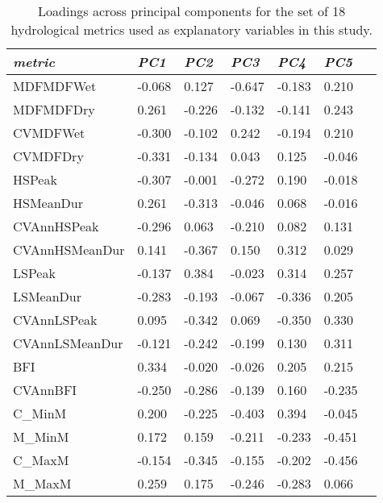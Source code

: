 \begin{table}[ht]
\tiny
\centering
\caption[Loadings across principal components for hydrological metrics.]{Loadings across principal components for the set of 18 hydrological metrics used as explanatory variables in this study.}
\label{Ch4sup_T2}
\begin{tabu} to 
\hline
\textit{metric}         & \textit{PC1}    & \textit{PC2}    & \textit{PC3}    & \textit{PC4}    & \textit{PC5}    \\ \hline
MDFMDFWet      & -0.068 & 0.127  & -0.647 & -0.183 & 0.210  \\
MDFMDFDry      & 0.261  & -0.226 & -0.132 & -0.141 & 0.243  \\
CVMDFWet       & -0.300 & -0.102 & 0.242  & -0.194 & 0.210  \\
CVMDFDry       & -0.331 & -0.134 & 0.043  & 0.125  & -0.046 \\
HSPeak         & -0.307 & -0.001 & -0.272 & 0.190  & -0.018 \\
HSMeanDur      & 0.261  & -0.313 & -0.046 & 0.068  & -0.016 \\
CVAnnHSPeak    & -0.296 & 0.063  & -0.210 & 0.082  & 0.131  \\
CVAnnHSMeanDur & 0.141  & -0.367 & 0.150  & 0.312  & 0.029  \\
LSPeak         & -0.137 & 0.384  & -0.023 & 0.314  & 0.257  \\
LSMeanDur      & -0.283 & -0.193 & -0.067 & -0.336 & 0.205  \\
CVAnnLSPeak    & 0.095  & -0.342 & 0.069  & -0.350 & 0.330  \\
CVAnnLSMeanDur & -0.121 & -0.242 & -0.199 & 0.130  & 0.311  \\
BFI            & 0.334  & -0.020 & -0.026 & 0.205  & 0.215  \\
CVAnnBFI       & -0.250 & -0.286 & -0.139 & 0.160  & -0.235 \\
C\_MinM        & 0.200  & -0.225 & -0.403 & 0.394  & -0.045 \\
M\_MinM        & 0.172  & 0.159  & -0.211 & -0.233 & -0.451 \\
C\_MaxM        & -0.154 & -0.345 & -0.155 & -0.202 & -0.456 \\
M\_MaxM        & 0.259  & 0.175  & -0.246 & -0.283 & 0.066  \\ \hline
\end{tabu}
\end{table}


